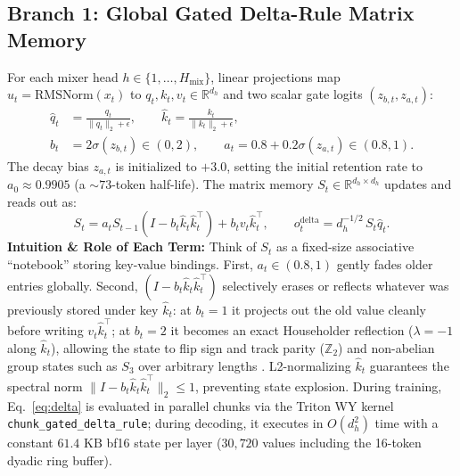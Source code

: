 \documentclass[10pt,a4paper]{article}
\begin{document}
\subsection{Branch 1: Global Gated Delta-Rule Matrix Memory}
For each mixer head $h \in \{1,\dots,H_{\text{mix}}\}$, linear projections map $u_t = \text{RMSNorm}(x_t)$ to $q_t, k_t, v_t \in \mathbb{R}^{d_h}$ and two scalar gate logits $(z_{b,t}, z_{a,t})$:
\begin{equation}
  \begin{aligned}
  \hat{q}_t &= \frac{q_t}{\|q_t\|_2 + \epsilon}, \qquad
  \hat{k}_t = \frac{k_t}{\|k_t\|_2 + \epsilon}, \\
  b_t &= 2\sigma(z_{b,t}) \in (0, 2), \qquad
  a_t = 0.8 + 0.2\sigma(z_{a,t}) \in (0.8, 1).
  \end{aligned}
  \label{eq:gates}
\end{equation}
The decay bias $z_{a,t}$ is initialized to $+3.0$, setting the initial retention rate to $a_0 \approx 0.9905$ (a $\sim 73$-token half-life). The matrix memory $S_t \in \mathbb{R}^{d_h \times d_h}$ updates and reads out as:
\begin{equation}
  S_t = a_t S_{t-1}\!\left(I - b_t \hat{k}_t \hat{k}_t^\top\right) + b_t v_t \hat{k}_t^\top, \qquad
  o_t^{\text{delta}} = d_h^{-1/2}\, S_t \hat{q}_t.
  \label{eq:delta}
\end{equation}
\noindent\textbf{Intuition \& Role of Each Term:} Think of $S_t$ as a fixed-size associative ``notebook'' storing key-value bindings. First, $a_t \in (0.8,1)$ gently fades older entries globally. Second, $(I - b_t \hat{k}_t \hat{k}_t^\top)$ selectively erases or reflects whatever was previously stored under key $\hat{k}_t$: at $b_t=1$ it projects out the old value cleanly before writing $v_t \hat{k}_t^\top$; at $b_t=2$ it becomes an exact Householder reflection ($\lambda = -1$ along $\hat{k}_t$), allowing the state to flip sign and track parity ($\mathbb{Z}_2$) and non-abelian group states such as $S_3$ over arbitrary lengths \cite{grazzi2024}. L2-normalizing $\hat{k}_t$ guarantees the spectral norm $\|I - b_t \hat{k}_t \hat{k}_t^\top\|_2 \le 1$, preventing state explosion. During training, Eq.~\eqref{eq:delta} is evaluated in parallel chunks via the Triton WY kernel \texttt{chunk\_gated\_delta\_rule}; during decoding, it executes in $O(d_h^2)$ time with a constant $61.4\text{ KB}$ bf16 state per layer ($30{,}720$ values including the 16-token dyadic ring buffer).
\end{document}
